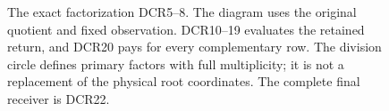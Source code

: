 \documentclass[11pt]{article}
\newcommand{\C}{\mathbb C}
\begin{document}
\begin{figure}[ht]\centering
{}
\caption{The exact factorization DCR5--8. The diagram uses the
original quotient and fixed observation. DCR10--19 evaluates the
retained return, and DCR20 pays for every complementary row.
The division circle defines primary factors with full multiplicity;
it is not a replacement of the physical root coordinates.
The complete final receiver is DCR22.}
\end{figure}
\end{document}
